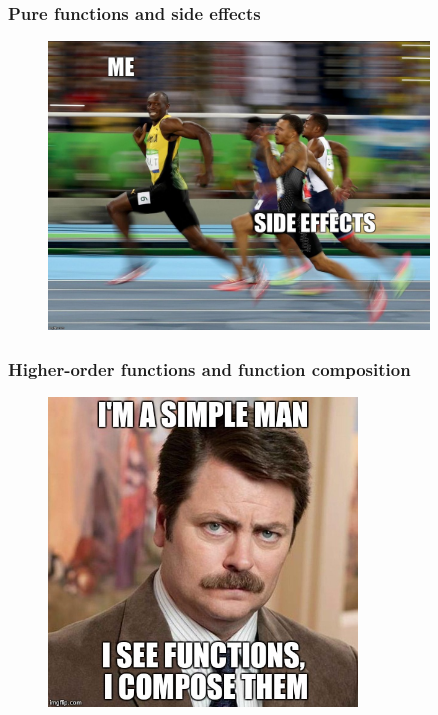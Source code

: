 \documentclass[18pt, compress]{beamer}
\begin{document}
\begin{frame}
    \frametitle{Pure functions and side effects}
    \vspace{-20pt}
    \begin{figure}
        \includegraphics[width=0.9\textwidth,center]{side_effect.jpg}
    \end{figure}
\end{frame}

\begin{frame}
    \frametitle{Higher-order functions and function composition}
    \vspace{-25pt}
    \begin{figure}
        \includegraphics[width=0.73\textwidth,center]{function_composition.jpg}
    \end{figure}
\end{frame}
\end{document}

